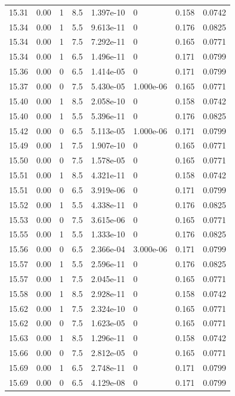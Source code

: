 \documentclass[preview]{standalone}
\begin{document}
{{{{{{{{{{{{{{{{{{\begin{tabular}{L{1.2cm}C{1.2cm} C{0.3cm}C{0.5cm} C{1.4cm}C{1.4cm} C{1.4cm}C{1.4cm}}
  15.31  &  0.00  & 1     & 8.5 &  1.397e-10  & 0  & 0.158 &  0.0742   \\ 
  15.34  &  0.00  & 1     & 5.5 &  9.613e-11  & 0  & 0.176 &  0.0825   \\ 
  15.34  &  0.00  & 1     & 7.5 &  7.292e-11  & 0  & 0.165 &  0.0771   \\ 
  15.34  &  0.00  & 1     & 6.5 &  1.496e-11  & 0  & 0.171 &  0.0799   \\ 
  15.36  &  0.00  & 0     & 6.5 &  1.414e-05  & 0  & 0.171 &  0.0799   \\ 
  15.37  &  0.00  & 0     & 7.5 &  5.430e-05  & 1.000e-06  & 0.165 &  0.0771   \\ 
  15.40  &  0.00  & 1     & 8.5 &  2.058e-10  & 0  & 0.158 &  0.0742   \\ 
  15.40  &  0.00  & 1     & 5.5 &  5.396e-11  & 0  & 0.176 &  0.0825   \\ 
  15.42  &  0.00  & 0     & 6.5 &  5.113e-05  & 1.000e-06  & 0.171 &  0.0799   \\ 
  15.49  &  0.00  & 1     & 7.5 &  1.907e-10  & 0  & 0.165 &  0.0771   \\ 
  15.50  &  0.00  & 0     & 7.5 &  1.578e-05  & 0  & 0.165 &  0.0771   \\ 
  15.51  &  0.00  & 1     & 8.5 &  4.321e-11  & 0  & 0.158 &  0.0742   \\ 
  15.51  &  0.00  & 0     & 6.5 &  3.919e-06  & 0  & 0.171 &  0.0799   \\ 
  15.52  &  0.00  & 1     & 5.5 &  4.338e-11  & 0  & 0.176 &  0.0825   \\ 
  15.53  &  0.00  & 0     & 7.5 &  3.615e-06  & 0  & 0.165 &  0.0771   \\ 
  15.55  &  0.00  & 1     & 5.5 &  1.333e-10  & 0  & 0.176 &  0.0825   \\ 
  15.56  &  0.00  & 0     & 6.5 &  2.366e-04  & 3.000e-06  & 0.171 &  0.0799   \\ 
  15.57  &  0.00  & 1     & 5.5 &  2.596e-11  & 0  & 0.176 &  0.0825   \\ 
  15.57  &  0.00  & 1     & 7.5 &  2.045e-11  & 0  & 0.165 &  0.0771   \\ 
  15.58  &  0.00  & 1     & 8.5 &  2.928e-11  & 0  & 0.158 &  0.0742   \\ 
  15.62  &  0.00  & 1     & 7.5 &  2.324e-10  & 0  & 0.165 &  0.0771   \\ 
  15.62  &  0.00  & 0     & 7.5 &  1.623e-05  & 0  & 0.165 &  0.0771   \\ 
  15.63  &  0.00  & 1     & 8.5 &  1.296e-11  & 0  & 0.158 &  0.0742   \\ 
  15.66  &  0.00  & 0     & 7.5 &  2.812e-05  & 0  & 0.165 &  0.0771   \\ 
  15.69  &  0.00  & 1     & 6.5 &  2.748e-11  & 0  & 0.171 &  0.0799   \\ 
  15.69  &  0.00  & 0     & 6.5 &  4.129e-08  & 0  & 0.171 &  0.0799   \\ 
\hline 
\end{tabular} 

}}}}}}}}}}}}}}}}}}
\end{document}
